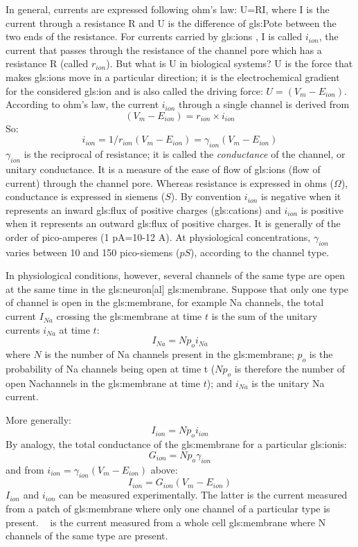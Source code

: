 \documentclass[../../Orator]{subfiles}
\begin{document}
In general, currents are expressed following ohm’s law: U=RI, where I is the current through a resistance R and U is the difference of \gls{gls:Pote} between the two ends of the resistance. For currents carried by \glspl{gls:ion} , I is called  \(i_{ion}\), the current that passes through the resistance of the channel pore which has a resistance R (called  \(r_{ion}\)). But what is U in biological systems? U is the force that makes \glspl{gls:ion} move in a particular direction; it is the electrochemical gradient for the considered \gls{gls:ion} and is also called the driving force: \(U=(V_m-E_{ion})\). According to ohm’s law, the current \(i_{ion}\) through a single channel is derived from \[(V_m - E_{ion}) = r_{ion}\times i_{ion}\]
So:\[i_{ion}=1/r_{ion}(V_m - E_{ion})= \gamma_{ion}(V_m - E_{ion}) \]
\(\gamma_{ion}\) is the reciprocal of resistance; it is called the \textit{conductance} of the channel, or unitary conductance. It is a measure of the ease of flow of \glspl{gls:ion} (flow of current) through the channel pore. Whereas resistance is expressed in ohms (\(\Omega\)), conductance is expressed in siemens (\(S\)). By convention \(i_{ion} \) is negative when it represents an inward \gls{gls:flux} of positive charges (\glspl{gls:cation}) and \( i_{ion}\) is positive when it represents an outward \gls{gls:flux} of positive charges. It is generally of the order of pico-amperes (1 pA=10-12 A). At physiological concentrations, \(\gamma_{ion}\) varies between 10 and 150 pico-siemens (\(pS\)), according to the channel type. 

In physiological conditions, however,  several channels of the same type are open at the same time in the \gls{gls:neuron}[al] \gls{gls:membrane}. Suppose that only one type of channel is open in the \gls{gls:membrane}, for example \gls{Na} channels, the total current \(I_{Na}\) crossing the \gls{gls:membrane} at time \(t\) is the sum of the unitary currents \(i_{Na}\) at time \(t\):\[I_{Na} = N p_o i_{Na}\]
where \(N\) is the number of \gls{Na} channels present in the \gls{gls:membrane}; \(p_o\) is the probability of \gls{Na} channels being open at time t (\(N p_o\) is therefore the number of open \gls{Na}channels in the \gls{gls:membrane} at time \(t\)); and \(i_{Na}\) is the unitary \gls{Na} current.  

More generally:\[I_{ion} = N p_o i_{ion}\]
By analogy, the total conductance of the \gls{gls:membrane} for a particular \gls{gls:ion}is: \[G_{ion} = N p_o \gamma_{ion}\]
and from \(i_{ion}=\gamma_{ion}(V_m - E_{ion})\) above: 
\[I_{ion}= G_{ion}(V_m - E_{ion})\]
 \(I_{ion}\) and \(i_{ion}\) can be measured experimentally. The latter is the current measured from a patch of \gls{gls:membrane} where only one channel of a particular type is present. \unit{\cur\ion} is the current measured from a whole cell \gls{gls:membrane} where N channels of the same type are present. 
 
\end{document}
